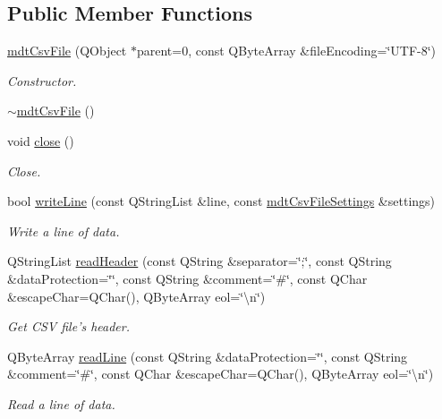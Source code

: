 \subsection*{Public Member Functions}
\begin{DoxyCompactItemize}
\item 
\hyperlink{classmdt_csv_file_aaca142b18a4f436548e17fbef755e2d5}{mdt\-Csv\-File} (Q\-Object $\ast$parent=0, const Q\-Byte\-Array \&file\-Encoding=\char`\"{}U\-T\-F-\/8\char`\"{})
\begin{DoxyCompactList}\small\item\em Constructor. \end{DoxyCompactList}\item 
\hyperlink{classmdt_csv_file_aea6a3fe22d2561b2dad65ed856e3d348}{$\sim$mdt\-Csv\-File} ()
\item 
void \hyperlink{classmdt_csv_file_abfe09c325401ac9ca39c9d2329d6bc9c}{close} ()
\begin{DoxyCompactList}\small\item\em Close. \end{DoxyCompactList}\item 
bool \hyperlink{classmdt_csv_file_a052957c4591eca34e19ec6a95c11a1e1}{write\-Line} (const Q\-String\-List \&line, const \hyperlink{structmdt_csv_file_settings}{mdt\-Csv\-File\-Settings} \&settings)
\begin{DoxyCompactList}\small\item\em Write a line of data. \end{DoxyCompactList}\item 
Q\-String\-List \hyperlink{classmdt_csv_file_a4010d76497d8f5d2a85171025d31f100}{read\-Header} (const Q\-String \&separator=\char`\"{};\char`\"{}, const Q\-String \&data\-Protection=\char`\"{}\char`\"{}, const Q\-String \&comment=\char`\"{}\#\char`\"{}, const Q\-Char \&escape\-Char=Q\-Char(), Q\-Byte\-Array eol=\char`\"{}\textbackslash{}n\char`\"{})
\begin{DoxyCompactList}\small\item\em Get C\-S\-V file's header. \end{DoxyCompactList}\item 
Q\-Byte\-Array \hyperlink{classmdt_csv_file_aa7d5e7ab9d6d71f7ca1c9fe7bea043a3}{read\-Line} (const Q\-String \&data\-Protection=\char`\"{}\char`\"{}, const Q\-String \&comment=\char`\"{}\#\char`\"{}, const Q\-Char \&escape\-Char=Q\-Char(), Q\-Byte\-Array eol=\char`\"{}\textbackslash{}n\char`\"{})
\begin{DoxyCompactList}\small\item\em Read a line of data. \end{DoxyCompactList}\item 

\end{DoxyCompactItemize}
